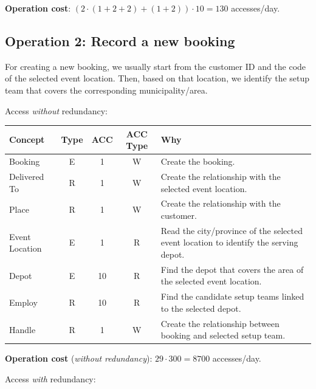 \textbf{Operation cost}: $(2 \cdot (1 + 2 + 2) + (1 + 2)) \cdot 10 = 130$ accesses/day.

\subsection*{Operation 2: Record a new booking}

For creating a new booking, we usually start from the customer ID and the code of the selected event location. Then, based on that location, we identify the setup team that covers the corresponding municipality/area.

Access \textit{without} redundancy:

\begin{table}[H]
    \centering
    \begin{tabular}{|l|c|c|c|p{6.3cm}|}
    \hline
    \textbf{Concept} & \textbf{Type} & \textbf{ACC} & \textbf{ACC Type} & \textbf{Why} \\
    \hline
    Booking & E & 1 & W & Create the booking. \\
    \hline
    Delivered To & R & 1 & W & Create the relationship with the selected event location. \\
    \hline
    Place & R & 1 & W & Create the relationship with the customer. \\
    \hline
    Event Location & E & 1 & R & Read the city/province of the selected event location to identify the serving depot. \\
    \hline
    Depot & E & 10 & R & Find the depot that covers the area of the selected event location. \\
    \hline
    Employ & R & 10 & R & Find the candidate setup teams linked to the selected depot. \\
    \hline
    Handle & R & 1 & W & Create the relationship between booking and selected setup team. \\
    \hline
    \end{tabular}
\end{table}

\textbf{Operation cost} (\textit{without redundancy}): $29 \cdot 300 = 8700$ accesses/day.

Access \textit{with} redundancy:

